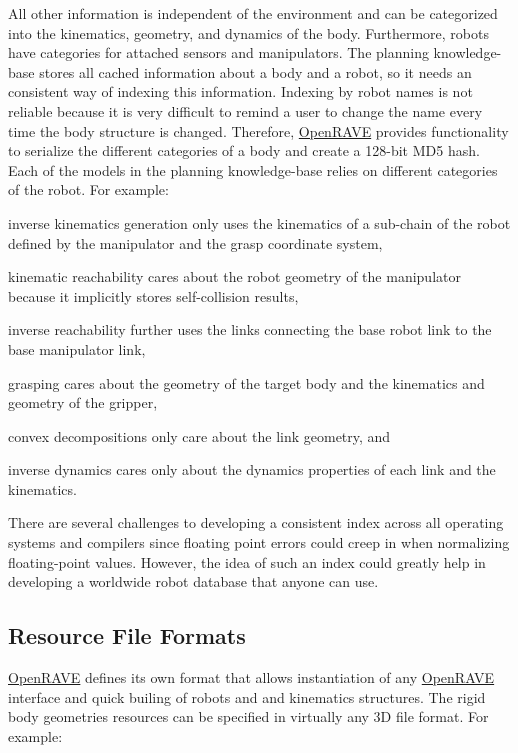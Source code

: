 All other information is independent of the environment and can be categorized into the kinematics, geometry, and dynamics of the body. Furthermore, robots have categories for attached sensors and manipulators. The planning knowledge-\/base stores all cached information about a body and a robot, so it needs an consistent way of indexing this information. Indexing by robot names is not reliable because it is very difficult to remind a user to change the name every time the body structure is changed. Therefore, \hyperlink{namespaceOpenRAVE}{OpenRAVE} provides functionality to serialize the different categories of a body and create a 128-\/bit MD5 hash. Each of the models in the planning knowledge-\/base relies on different categories of the robot. For example:


\begin{DoxyItemize}
\item inverse kinematics generation only uses the kinematics of a sub-\/chain of the robot defined by the manipulator and the grasp coordinate system,
\item kinematic reachability cares about the robot geometry of the manipulator because it implicitly stores self-\/collision results,
\item inverse reachability further uses the links connecting the base robot link to the base manipulator link,
\item grasping cares about the geometry of the target body and the kinematics and geometry of the gripper,
\item convex decompositions only care about the link geometry, and
\item inverse dynamics cares only about the dynamics properties of each link and the kinematics.
\end{DoxyItemize}

There are several challenges to developing a consistent index across all operating systems and compilers since floating point errors could creep in when normalizing floating-\/point values. However, the idea of such an index could greatly help in developing a worldwide robot database that anyone can use.\hypertarget{architecture__concepts_supported_formats}{}\subsection{Resource File Formats}\label{architecture__concepts_supported_formats}
\hyperlink{namespaceOpenRAVE}{OpenRAVE} defines its own  format that allows instantiation of any \hyperlink{namespaceOpenRAVE}{OpenRAVE} interface and quick builing of robots and and kinematics structures. The rigid body geometries resources can be specified in virtually any 3D file format. For example:


